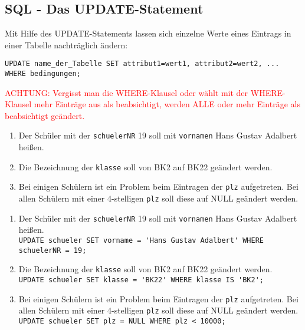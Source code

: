 \subsection[UPDATE-Statement]{SQL - Das UPDATE-Statement}
Mit Hilfe des UPDATE-Statements lassen sich einzelne Werte eines Eintrags in einer Tabelle nachträglich ändern:
\begin{tcolorbox}[title=UPDATE-Statement]
	\lstinline[breaklines=true]!UPDATE name_der_Tabelle SET attribut1=wert1, attribut2=wert2, ... WHERE bedingungen;!
\end{tcolorbox}
\textcolor{red}{ACHTUNG: Vergisst man die WHERE-Klausel oder wählt mit der WHERE-Klausel mehr Einträge aus als beabsichtigt, werden ALLE oder mehr Einträge als beabsichtigt geändert.}
\begin{Exercise}[title={Ändere folgende Einträge aus der Datenbank:}, label=Update]
	\begin{enumerate}
		\item Der Schüler mit der \lstinline!schuelerNR! 19 soll mit \lstinline!vornamen! Hans Gustav Adalbert heißen.
		\item Die Bezeichnung der \lstinline!klasse! soll von BK2 auf BK22 geändert werden.
		\item Bei einigen Schülern ist ein Problem beim Eintragen der \lstinline!plz! aufgetreten. Bei allen Schülern mit einer 4-stelligen \lstinline!plz! soll diese auf NULL geändert werden.
	\end{enumerate}
\end{Exercise}
\begin{Answer}[ref=Update]
	\begin{enumerate}
		\item Der Schüler mit der \lstinline!schuelerNR! 19 soll mit \lstinline!vornamen! Hans Gustav Adalbert heißen.\\
		\lstinline!UPDATE schueler SET vorname = 'Hans Gustav Adalbert' WHERE schuelerNR = 19;!
		\item Die Bezeichnung der \lstinline!klasse! soll von BK2 auf BK22 geändert werden.\\
		\lstinline!UPDATE schueler SET klasse = 'BK22' WHERE klasse IS 'BK2';!
		\item Bei einigen Schülern ist ein Problem beim Eintragen der \lstinline!plz! aufgetreten. Bei allen Schülern mit einer 4-stelligen \lstinline!plz! soll diese auf NULL geändert werden.\\
		\lstinline!UPDATE schueler SET plz = NULL WHERE plz < 10000;!
	\end{enumerate}
\end{Answer}